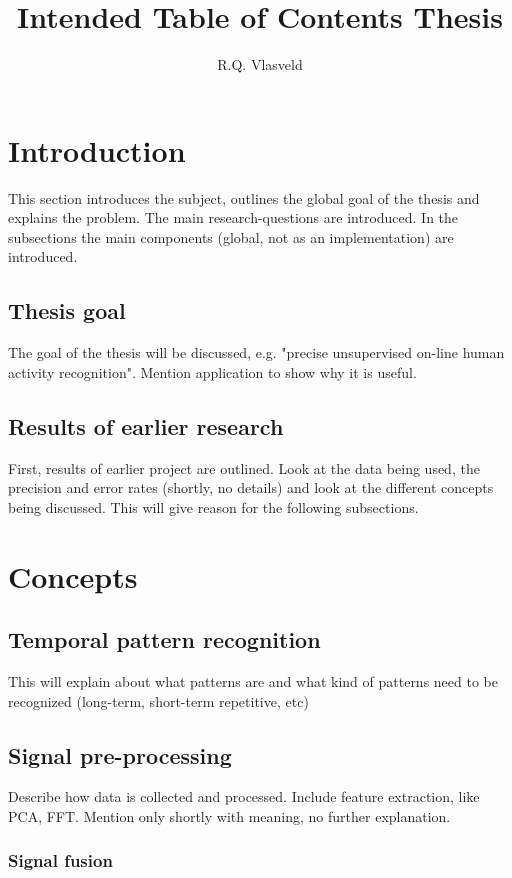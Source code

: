 \documentclass[a4paper,10pt]{extarticle}
\author{R.Q. Vlasveld}
\title{Intended Table of Contents Thesis}
\begin{document}
\maketitle
\tableofcontents

\section{Introduction}
This section introduces the subject, outlines the global goal of the thesis and explains the problem.
The main research-questions are introduced.
In the subsections the main components (global, not as an implementation) are introduced.

  \subsection{Thesis goal}
  The goal of the thesis will be discussed, e.g. "precise unsupervised on-line human activity recognition".
  Mention application to show why it is useful.

  \subsection{Results of earlier research}
  First, results of earlier project are outlined. Look at the data being used, the precision and error rates (shortly, no details) and look at the different concepts being discussed.
  This will give reason for the following subsections.

\section{Concepts}

  \subsection{Temporal pattern recognition}
  This will explain about what patterns are and what kind of patterns need to be recognized (long-term, short-term repetitive, etc)

	\subsection{Signal pre-processing}
  Describe how data is collected and processed. Include feature extraction, like PCA, FFT.
  Mention only shortly with meaning, no further explanation.

    \subsubsection{Signal fusion}
\end{document}
